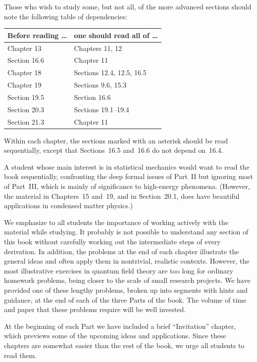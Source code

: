 Those who wish to study some, but not all, of the more advanced sections
should note the following table of dependencies:
\begin{center}
\begin{tabular}{ll}
\toprule
Before reading \ldots & one should read all of \ldots\\
\midrule
Chapter 13            & Chapters 11, 12\\
Section 16.6          & Chapter 11\\
Chapter 18            & Sections 12.4, 12.5, 16.5\\
Chapter 19            & Sections 9.6, 15.3\\
Section 19.5          & Section 16.6\\
Section 20.3          & Sections 19.1--19.4\\
Section 21.3          & Chapter 11\\
\bottomrule
\end{tabular}
\end{center}

Within each chapter, the sections marked with an asterisk should be read
sequentially, except that Sections~16.5 and~16.6 do not depend on~16.4.

A student whose main interest is in statistical mechanics would want to
read the book sequentially, confronting the deep formal issues of Part~II
but ignoring most of Part~III, which is mainly of significance to
high-energy phenomena.  (However, the material in Chapters~15 and~19, and
in Section~20.1, does have beautiful applications in condensed matter
physics.)

We emphasize to all students the importance of working actively with the
material while studying.  It probably is not possible to understand any
section of this book without carefully working out the intermediate steps
of every derivation.  In addition, the problems at the end of each chapter
illustrate the general ideas and often apply them in nontrivial, realistic
contexts.  However, the most illustrative exercises in quantum field
theory are too long for ordinary homework problems, being closer to the
scale of small research projects.  We have provided one of these lengthy
problems, broken up into segments with hints and guidance, at the end of
each of the three Parts of the book.  The volume of time and paper that
these problems require will be well invested.

At the beginning of each Part we have included a brief ``Invitation''
chapter, which previews some of the upcoming ideas and applications.
Since these chapters are somewhat easier than the rest of the book, we
urge all students to read them.

